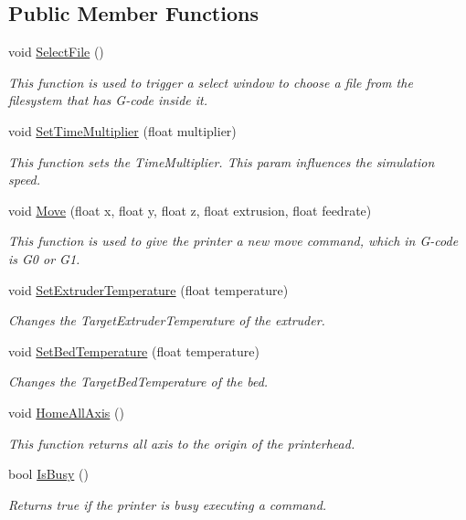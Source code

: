 \subsection*{Public Member Functions}
\begin{DoxyCompactItemize}
\item 
void \hyperlink{class_printer_aca020f5d2c184af8ecdfd818577815bd}{Select\+File} ()
\begin{DoxyCompactList}\small\item\em This function is used to trigger a select window to choose a file from the filesystem that has G-\/code inside it. \end{DoxyCompactList}\item 
void \hyperlink{class_printer_ab90889903063563e05b7c6409a944752}{Set\+Time\+Multiplier} (float multiplier)
\begin{DoxyCompactList}\small\item\em This function sets the Time\+Multiplier. This param influences the simulation speed. \end{DoxyCompactList}\item 
void \hyperlink{class_printer_adfa651ad28cdcb1b26f135f32d414f74}{Move} (float x, float y, float z, float extrusion, float feedrate)
\begin{DoxyCompactList}\small\item\em This function is used to give the printer a new move command, which in G-\/code is G0 or G1. \end{DoxyCompactList}\item 
void \hyperlink{class_printer_a0a643543a8efddd43be14a38f79bb2f6}{Set\+Extruder\+Temperature} (float temperature)
\begin{DoxyCompactList}\small\item\em Changes the Target\+Extruder\+Temperature of the extruder. \end{DoxyCompactList}\item 
void \hyperlink{class_printer_a8c02274e73916d00fd91d396ec1dd0d5}{Set\+Bed\+Temperature} (float temperature)
\begin{DoxyCompactList}\small\item\em Changes the Target\+Bed\+Temperature of the bed. \end{DoxyCompactList}\item 
void \hyperlink{class_printer_abd07f61fbe01864e653c30c2712e9f90}{Home\+All\+Axis} ()
\begin{DoxyCompactList}\small\item\em This function returns all axis to the origin of the printerhead. \end{DoxyCompactList}\item 
bool \hyperlink{class_printer_a5f4ec3c78049dfb3b29c2d2e069326c2}{Is\+Busy} ()
\begin{DoxyCompactList}\small\item\em Returns true if the printer is busy executing a command. \end{DoxyCompactList}\end{DoxyCompactItemize}
